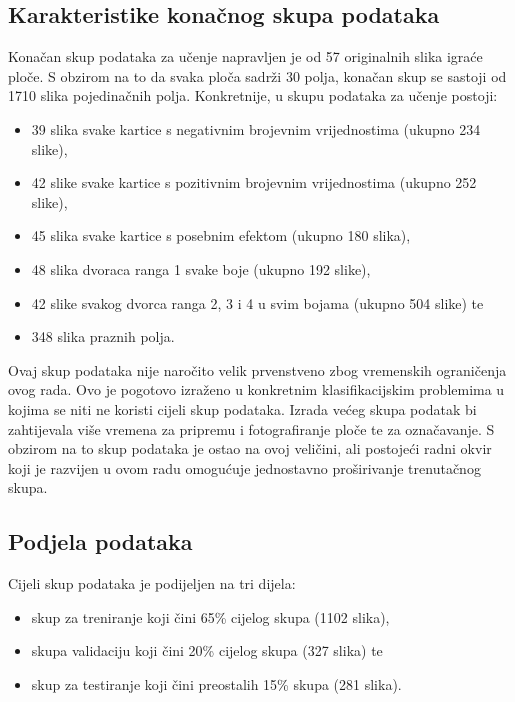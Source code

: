 \documentclass[diplomskirad]{fer}
\begin{document}
		\subsection{Karakteristike konačnog skupa podataka}
		\label{podpog:karakteristike_podataka}
			Konačan skup podataka za učenje napravljen je od 57 originalnih slika igraće ploče. S obzirom na to da svaka ploča sadrži 30 polja, konačan skup se sastoji od 1710 slika pojedinačnih polja. Konkretnije, u skupu podataka za učenje postoji:
			\begin{itemize}
				\item 39 slika svake kartice s negativnim brojevnim vrijednostima (ukupno 234 slike),
				\item 42 slike svake kartice s pozitivnim brojevnim vrijednostima (ukupno 252 slike),
				\item 45 slika svake kartice s posebnim efektom (ukupno 180 slika),
				\item 48 slika dvoraca ranga 1 svake boje (ukupno 192 slike),
				\item 42 slike svakog dvorca ranga 2, 3 i 4 u svim bojama (ukupno 504 slike) te
				\item 348 slika praznih polja.
			\end{itemize}
			
			Ovaj skup podataka nije naročito velik prvenstveno zbog vremenskih ograničenja ovog rada. Ovo je pogotovo izraženo u konkretnim klasifikacijskim problemima u kojima se niti ne koristi cijeli skup podataka. Izrada većeg skupa podatak bi zahtijevala više vremena za pripremu i fotografiranje ploče te za označavanje. S obzirom na to skup podataka je ostao na ovoj veličini, ali postojeći radni okvir koji je razvijen u ovom radu omogućuje jednostavno proširivanje trenutačnog skupa.
		
		\subsection{Podjela podataka}
		\label{podpog:podjela_podataka}
			Cijeli skup podataka je podijeljen na tri dijela: 
			\begin{itemize}
				\item skup za treniranje koji čini 65\% cijelog skupa (1102 slika),
				\item skupa validaciju koji čini 20\% cijelog skupa (327 slika) te
				\item skup za testiranje koji čini preostalih 15\% skupa (281 slika).
			\end{itemize}
			
\end{document}
